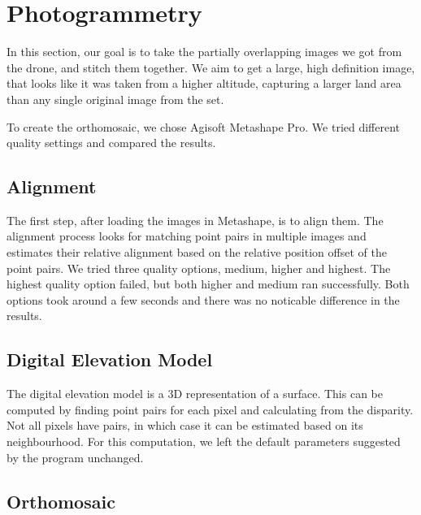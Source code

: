 \documentclass[../Head/Main.tex]{subfiles}
\begin{document}
\section{Photogrammetry}
In this section, our goal is to take the partially overlapping images we got from the drone, and stitch them together.
We aim to get a large, high definition image, that looks like it was taken from a higher altitude, 
capturing a larger land area than any single original image from the set.

To create the orthomosaic, we chose Agisoft Metashape Pro. 
We tried different quality settings and compared the results.

\subsection{Alignment}

The first step, after loading the images in Metashape, is to align them.
The alignment process looks for matching point pairs in multiple images and estimates their relative alignment based on the relative position offset of the point pairs.
We tried three quality options, medium, higher and highest.
The highest quality option failed, but both higher and medium ran successfully.
Both options took around a few seconds and there was no noticable difference in the results.

\subsection{Digital Elevation Model}
The digital elevation model is a 3D representation of a surface.
This can be computed by finding point pairs for each pixel and calculating from the disparity.
Not all pixels have pairs, in which case it can be estimated based on its neighbourhood.
For this computation, we left the default parameters suggested by the program unchanged.

\subsection{Orthomosaic}
\end{document}
